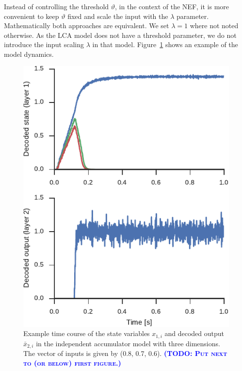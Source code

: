 \documentclass[10pt,letterpaper]{article}
\makeatletter
\newcommand{\todo}[1]{\textbf{\textsc{\textcolor{blue}{(TODO\@: #1)}}}}
\makeatother
\begin{document}
Instead of controlling the threshold $\vartheta$, in the context of the NEF, it is more convenient to keep $\vartheta$ fixed and scale the input with the $\lambda$ parameter.
Mathematically both approaches are equivalent.
We set $\lambda = 1$ where not noted otherwise.
As the LCA model does not have a threshold parameter, we do not introduce the input scaling $\lambda$ in that model.
Figure~\ref{fig:indacc} shows an example of the model dynamics.
\begin{figure}
    \centering
    \includegraphics{figures/indacc}
    \caption{Example time course of the state variables $x_{1,i}$ and decoded 
        output $\bar{x}_{2,i}$ in the independent accumulator model with three 
        dimensions. The vector of inputs is given by (0.8, 0.7, 0.6).
        \todo{Put next to (or below) first figure.}
    }\label{fig:indacc}
\end{figure}
\end{document}
